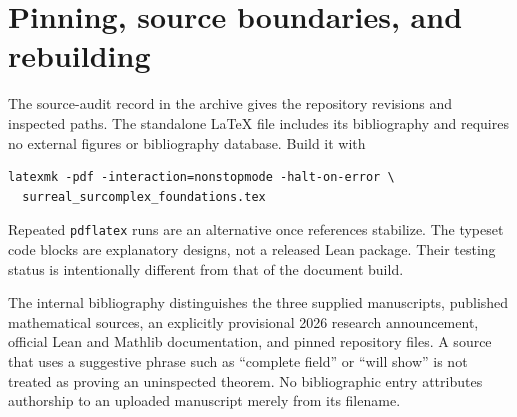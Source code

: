\documentclass[11pt,letterpaper]{article}
\numberwithin{equation}{section}
\theoremstyle{definition}
\theoremstyle{remark}
\begin{document}
\section{Pinning, source boundaries, and rebuilding}\label{app:repro}
The source-audit record in the archive gives the repository revisions and inspected paths. The standalone LaTeX file includes its bibliography and requires no external figures or bibliography database. Build it with
\begin{samepage}
\begin{lstlisting}
latexmk -pdf -interaction=nonstopmode -halt-on-error \
  surreal_surcomplex_foundations.tex
\end{lstlisting}
\end{samepage}
Repeated \texttt{pdflatex} runs are an alternative once references stabilize. The typeset code blocks are explanatory designs, not a released Lean package. Their testing status is intentionally different from that of the document build.

The internal bibliography distinguishes the three supplied manuscripts, published mathematical sources, an explicitly provisional 2026 research announcement, official Lean and Mathlib documentation, and pinned repository files. A source that uses a suggestive phrase such as ``complete field'' or ``will show'' is not treated as proving an uninspected theorem. No bibliographic entry attributes authorship to an uploaded manuscript merely from its filename.
\end{document}
